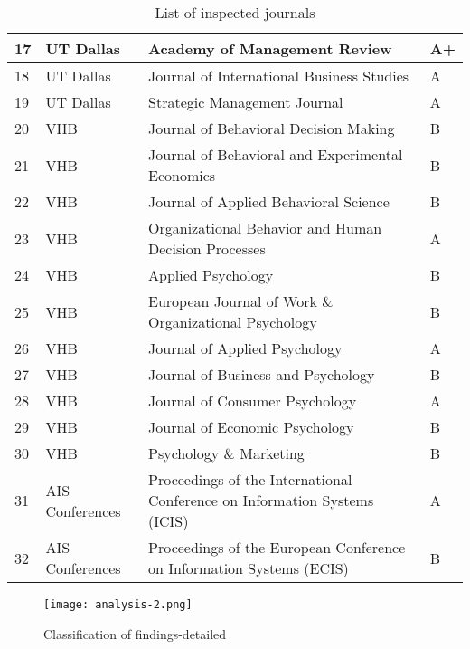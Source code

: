\begin{table}[h!]
\begin{tabular}{l|l|p{9cm}|l}
17 & UT Dallas & Academy of Management Review & A+ \\ \hline
18 & UT Dallas & Journal of International Business Studies & A \\ \hline
19 & UT Dallas & Strategic Management Journal & A \\ \hline
20 & VHB & Journal of Behavioral Decision Making & B \\ \hline
21 & VHB & Journal of Behavioral and Experimental Economics & B \\ \hline
22 & VHB & Journal of Applied Behavioral Science & B \\ \hline
23 & VHB & Organizational Behavior and Human Decision Processes & A \\ \hline
24 & VHB & Applied Psychology & B \\ \hline
25 & VHB & European Journal of Work \& Organizational Psychology & B \\ \hline
26 & VHB & Journal of Applied Psychology & A \\ \hline
27 & VHB & Journal of Business and Psychology & B \\ \hline
28 & VHB & Journal of Consumer Psychology & A \\ \hline
29 & VHB & Journal of Economic Psychology & B \\ \hline
30 & VHB & Psychology \& Marketing & B \\ \hline
31 & AIS Conferences & Proceedings of the International Conference on Information Systems (ICIS) & A \\ \hline
32 & AIS Conferences & Proceedings of the European Conference on Information Systems (ECIS) & B \\
\end{tabular}
\caption{List of inspected journals}
\label{table:journals}
\end{table}

\newpage

\begin{figure}[h!]
    \centering
    \texttt{[image: analysis-2.png]}
    \caption{Classification of findings-detailed}
    \label{fig:analysis-detail}
\end{figure}

\newpage

